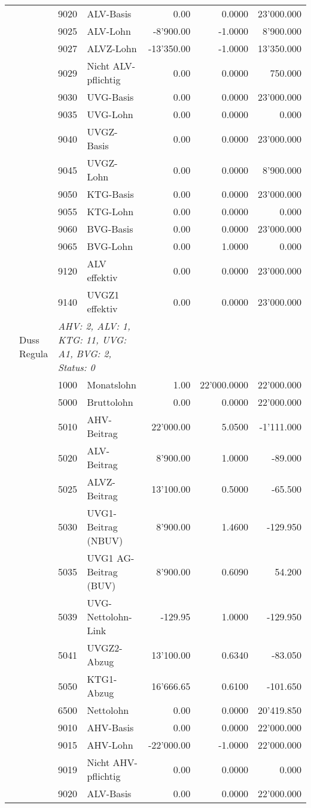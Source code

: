 \documentclass[15pt,a4paper]{article}
\begin{document}
\begin{longtable}{@{\extracolsep{\fill}}l l l l|r|r|r}
&&9020&ALV-Basis&0.00&0.0000&23'000.000\\
&&9025&ALV-Lohn&-8'900.00&-1.0000&8'900.000\\
&&9027&ALVZ-Lohn&-13'350.00&-1.0000&13'350.000\\
&&9029&Nicht ALV-pflichtig&0.00&0.0000&750.000\\
&&9030&UVG-Basis&0.00&0.0000&23'000.000\\
&&9035&UVG-Lohn&0.00&0.0000&0.000\\
&&9040&UVGZ-Basis&0.00&0.0000&23'000.000\\
&&9045&UVGZ-Lohn&0.00&0.0000&8'900.000\\
&&9050&KTG-Basis&0.00&0.0000&23'000.000\\
&&9055&KTG-Lohn&0.00&0.0000&0.000\\
&&9060&BVG-Basis&0.00&0.0000&23'000.000\\
&&9065&BVG-Lohn&0.00&1.0000&0.000\\
&&9120&ALV effektiv&0.00&0.0000&23'000.000\\
&&9140&UVGZ1 effektiv&0.00&0.0000&23'000.000\\
\pagebreak
5&Duss Regula&\multicolumn{2}{l|}{\small\emph{AHV: 2, ALV: 1, KTG: 11, UVG: A1, BVG: 2, Status: 0}}&& \\
&&1000&Monatslohn&1.00&22'000.0000&22'000.000\\
&&5000&Bruttolohn&0.00&0.0000&22'000.000\\
&&5010&AHV-Beitrag&22'000.00&5.0500&-1'111.000\\
&&5020&ALV-Beitrag&8'900.00&1.0000&-89.000\\
&&5025&ALVZ-Beitrag&13'100.00&0.5000&-65.500\\
&&5030&UVG1-Beitrag (NBUV)&8'900.00&1.4600&-129.950\\
&&5035&UVG1 AG-Beitrag (BUV)&8'900.00&0.6090&54.200\\
&&5039&UVG-Nettolohn-Link&-129.95&1.0000&-129.950\\
&&5041&UVGZ2-Abzug&13'100.00&0.6340&-83.050\\
&&5050&KTG1-Abzug&16'666.65&0.6100&-101.650\\
&&6500&Nettolohn&0.00&0.0000&20'419.850\\
&&9010&AHV-Basis&0.00&0.0000&22'000.000\\
&&9015&AHV-Lohn&-22'000.00&-1.0000&22'000.000\\
&&9019&Nicht AHV-pflichtig&0.00&0.0000&0.000\\
&&9020&ALV-Basis&0.00&0.0000&22'000.000\\

\end{longtable}
\end{document}
